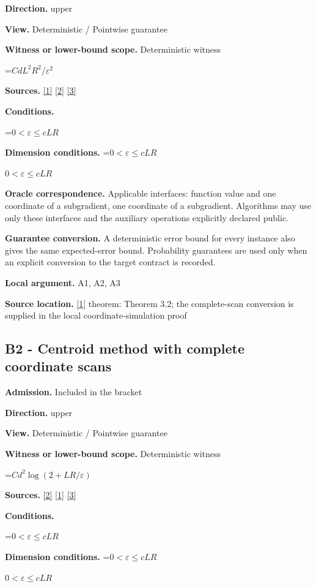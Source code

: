 \documentclass[10pt,a4paper]{article}
\newcommand{\AtlasMath}[1]{\par\begingroup\centering\setbox0=\hbox{$\displaystyle #1$}\ifdim\wd0>1.4\linewidth\typeout{ATLAS WIDE FORMULA: \the\wd0}\fi\ifdim\wd0>\linewidth\resizebox{\linewidth}{!}{\box0}\else\box0\fi\par\endgroup}
\newcommand{\AtlasInlineMath}[1]{\begingroup\setbox0=\hbox{$#1$}\ifdim\wd0>.4\linewidth\endgroup\AtlasMath{#1}\else\endgroup$#1$\fi}
\begin{document}
\textbf{Direction.} upper

\textbf{View.} Deterministic / Pointwise guarantee

\textbf{Witness or lower-bound scope.} Deterministic witness

\AtlasMath{CdL^2R^2/\varepsilon^2}
\textbf{Sources.} \href{https://arxiv.org/pdf/1405.4980}{[1]} \href{https://www2.isye.gatech.edu/~nemirovs/MOR_AccuracyCertificates.pdf}{[2]} \href{https://arxiv.org/pdf/2609.20701}{[3]}

\textbf{Conditions.} 
\AtlasMath{0<\varepsilon\le cLR}


\textbf{Dimension conditions.} \AtlasInlineMath{0<\varepsilon\le cLR}

\textbf{Oracle correspondence.} Applicable interfaces: function value and one coordinate of a subgradient, one coordinate of a subgradient. Algorithms may use only these interfaces and the auxiliary operations explicitly declared public.

\textbf{Guarantee conversion.} A deterministic error bound for every instance also gives the same expected-error bound. Probability guarantees are used only when an explicit conversion to the target contract is recorded.

\textbf{Local argument.} A1, A2, A3

\textbf{Source location.} \href{https://arxiv.org/pdf/1405.4980}{[1]} theorem: Theorem 3.2; the complete-scan conversion is supplied in the local coordinate-simulation proof

\subsection{B2 - Centroid method with complete coordinate scans}
\textbf{Admission.} Included in the bracket

\textbf{Direction.} upper

\textbf{View.} Deterministic / Pointwise guarantee

\textbf{Witness or lower-bound scope.} Deterministic witness

\AtlasMath{Cd^2\log(2+LR/\varepsilon)}
\textbf{Sources.} \href{https://www2.isye.gatech.edu/~nemirovs/MOR_AccuracyCertificates.pdf}{[2]} \href{https://arxiv.org/pdf/1405.4980}{[1]} \href{https://arxiv.org/pdf/2609.20701}{[3]}

\textbf{Conditions.} 
\AtlasMath{0<\varepsilon\le cLR}


\textbf{Dimension conditions.} \AtlasInlineMath{0<\varepsilon\le cLR}
\end{document}
